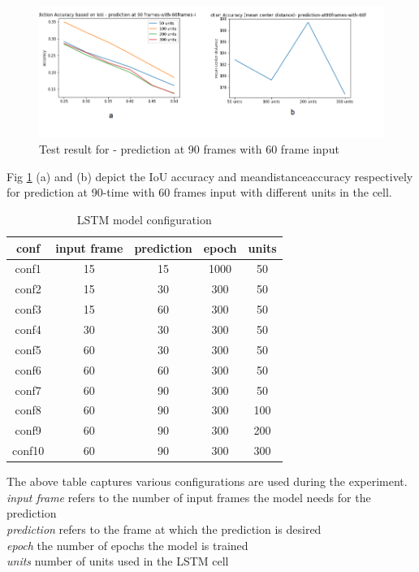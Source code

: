 \begin{figure}[H] 
\includegraphics[scale=0.8]{Phase4-accuracy.png}
\begin{center}
\caption{Test result for - prediction at 90 frames with 60 frame input}
\label{Phase4-accuracy}
\end{center}
\end{figure}

Fig \ref{Phase4-accuracy} (a) and (b) depict the IoU accuracy and mean\textunderscore distance\textunderscore accuracy respectively for prediction at 90-time with 60 frames input with different units in the cell. 


\begin {table}[H]
\begin{center}
 \begin{tabular}{||c c c c c||} 
 \hline
conf & input frame & prediction & epoch & units\\ [1.0ex] 
\hline\hline
conf1 & 15 & 15 & 1000 & 50 \\ 
\hline
conf2 & 15 & 30 & 300 & 50 \\ 
\hline
conf3 & 15 & 60 & 300 & 50 \\ 
\hline
conf4 & 30 & 30 & 300 & 50 \\ 
\hline
conf5 & 60 & 30 & 300 & 50 \\ 
\hline
conf6 & 60 & 60 & 300 & 50 \\ 
\hline
conf7 & 60 & 90 & 300 & 50 \\ 
\hline
conf8 & 60 & 90 & 300 & 100 \\ 
\hline
conf9 & 60 & 90 & 300 & 200 \\ 
\hline
conf10 & 60 & 90 & 300 & 300 \\ 
\hline
\end{tabular}
\caption{LSTM model configuration}
\end{center}
\end{table}
The above table captures various configurations are used during the experiment. \\
\textit{input frame} refers to the number of input frames the model needs for the prediction \\
\textit{prediction} refers to the frame at which the prediction is desired \\
\textit{epoch } the number of epochs the model is trained \\
\textit{units} number of units used in the LSTM cell

